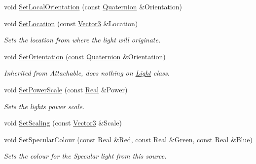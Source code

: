 \begin{DoxyCompactItemize}
\item 
void \hyperlink{classMezzanine_1_1Light_ac97ef9f7544c0710ce8c18dac91ec1ce}{SetLocalOrientation} (const \hyperlink{classMezzanine_1_1Quaternion}{Quaternion} \&Orientation)
\item 
void \hyperlink{classMezzanine_1_1Light_ac06da317651df700c2969cc81c3f8d3d}{SetLocation} (const \hyperlink{classMezzanine_1_1Vector3}{Vector3} \&Location)
\begin{DoxyCompactList}\small\item\em Sets the location from where the light will originate. \item\end{DoxyCompactList}\item 
void \hyperlink{classMezzanine_1_1Light_aa2f3fe2b7cb7bf459f2526d2e5c234ed}{SetOrientation} (const \hyperlink{classMezzanine_1_1Quaternion}{Quaternion} \&Orientation)
\begin{DoxyCompactList}\small\item\em Inherited from Attachable, does nothing on \hyperlink{classMezzanine_1_1Light}{Light} class. \item\end{DoxyCompactList}\item 
void \hyperlink{classMezzanine_1_1Light_af30837442661a8255a592b1a540b9692}{SetPowerScale} (const \hyperlink{namespaceMezzanine_a726731b1a7df72bf3583e4a97282c6f6}{Real} \&Power)
\begin{DoxyCompactList}\small\item\em Sets the lights power scale. \item\end{DoxyCompactList}\item 
void \hyperlink{classMezzanine_1_1Light_a643fa07c0b48ec2edad53e3c27345ab9}{SetScaling} (const \hyperlink{classMezzanine_1_1Vector3}{Vector3} \&Scale)
\item 
void \hyperlink{classMezzanine_1_1Light_a6fdcce86ef61cf45f93378b381b9c3fe}{SetSpecularColour} (const \hyperlink{namespaceMezzanine_a726731b1a7df72bf3583e4a97282c6f6}{Real} \&Red, const \hyperlink{namespaceMezzanine_a726731b1a7df72bf3583e4a97282c6f6}{Real} \&Green, const \hyperlink{namespaceMezzanine_a726731b1a7df72bf3583e4a97282c6f6}{Real} \&Blue)
\begin{DoxyCompactList}\small\item\em Sets the colour for the Specular light from this source. \item\end{DoxyCompactList}\item 

\end{DoxyCompactItemize}

